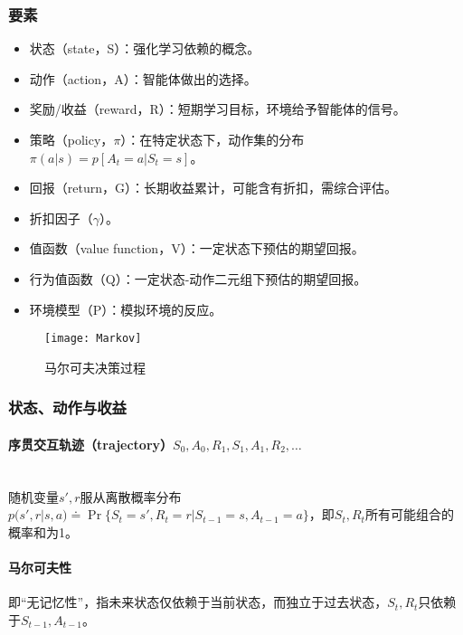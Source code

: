 \documentclass[
12pt, %
a4paper, 
oneside, %
headinclude,footinclude, %
]{scrartcl}
\begin{document}
\subsubsection{要素}
\begin{itemize}
\item 状态（state，S）：强化学习依赖的概念。
\item 动作（action，A）：智能体做出的选择。
\item 奖励/收益（reward，R）：短期学习目标，环境给予智能体的信号。
\item 策略（policy，$ \pi $）：在特定状态下，动作集的分布$ \pi(a|s) = p[A_t = a|S_t = s] $。
\item 回报（return，G）：长期收益累计，可能含有折扣，需综合评估。
\item 折扣因子（$ \gamma $）。
\item 值函数（value function，V）：一定状态下预估的期望回报。
\item 行为值函数（Q）：一定状态-动作二元组下预估的期望回报。
\item 环境模型（P）：模拟环境的反应。
\end{itemize}

\begin{figure}[H]
\centering 
\texttt{[image: Markov]} 
\caption[马尔可夫决策过程]{马尔可夫决策过程}
\end{figure}
\subsubsection{状态、动作与收益}
\paragraph{序贯交互轨迹（trajectory）$ S_0, A_0, R_1, S_1, A_1, R_2, \dots $}~\\

随机变量$ s',r $服从离散概率分布$ p(s', r|s, a) \doteq \Pr\{S_t = s', R_t = r|S_{t - 1} = s, A_{t - 1} = a\} $，即$ S_t,R_t $所有可能组合的概率和为1。
\paragraph{马尔可夫性}
即“无记忆性”，指未来状态仅依赖于当前状态，而独立于过去状态，$ S_t,R_t $只依赖于$ S_{t - 1},A_{t - 1} $。
\end{document}

